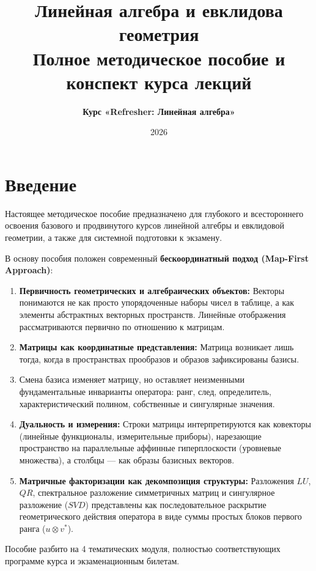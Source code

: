 \documentclass[12pt,a4paper]{report}
\title{\textbf{\LARGE Линейная алгебра и евклидова геометрия}\\[5mm]
\Large Полное методическое пособие и конспект курса лекций}
\author{\textbf{Курс «Refresher: Линейная алгебра»}}
\date{2026}
\theoremstyle{definition}
\theoremstyle{plain}
\theoremstyle{remark}
\begin{document}
    
    \maketitle
    
    \tableofcontents
    \newpage
    
    \chapter*{Введение}
    
    Настоящее методическое пособие предназначено для глубокого и всестороннего освоения базового и продвинутого курсов
    линейной алгебры и евклидовой геометрии, а также для системной подготовки к экзамену.
    
    В основу пособия положен современный \textbf{бескоординатный подход (Map-First Approach)}:
    \begin{enumerate}
        \item \textbf{Первичность геометрических и алгебраических объектов:} Векторы понимаются не как просто
        упорядоченные наборы чисел в таблице, а как элементы абстрактных векторных пространств.
        Линейные отображения рассматриваются первично по отношению к матрицам.
        \item \textbf{Матрицы как координатные представления:} Матрица возникает лишь тогда, когда в пространствах
        прообразов и образов зафиксированы базисы.
        \item Смена базиса изменяет матрицу, но оставляет неизменными фундаментальные инварианты оператора: ранг, след,
        определитель, характеристический полином, собственные и сингулярные значения.
        \item \textbf{Дуальность и измерения:} Строки матрицы интерпретируются как ковекторы (линейные функционалы,
        измерительные приборы), нарезающие пространство на параллельные аффинные гиперплоскости (уровневые множества),
        а столбцы — как образы базисных векторов.
        \item \textbf{Матричные факторизации как декомпозиция структуры:} Разложения $LU$, $QR$, спектральное разложение
        симметричных матриц и сингулярное разложение ($SVD$) представлены как последовательное раскрытие геометрического
        действия оператора в виде суммы простых блоков первого ранга ($u \otimes v^*$).
    \end{enumerate}
    
    Пособие разбито на 4 тематических модуля, полностью соответствующих программе курса и экзаменационным билетам.
    
\end{document}
